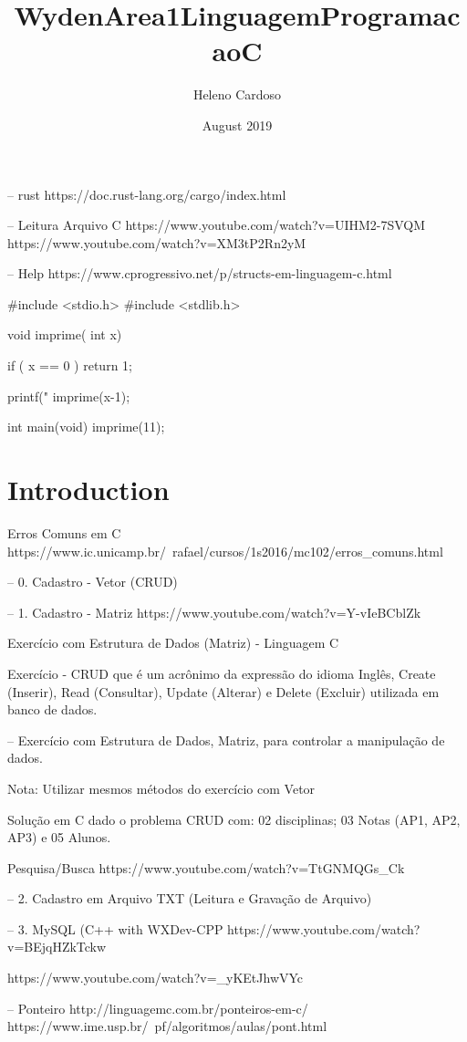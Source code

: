 \documentclass{article}
\title{WydenArea1LinguagemProgramacaoC}
\author{Heleno Cardoso}
\date{August 2019}
\begin{document}
-- rust
https://doc.rust-lang.org/cargo/index.html

\maketitle

-- Leitura Arquivo C
https://www.youtube.com/watch?v=UIHM2-7SVQM
https://www.youtube.com/watch?v=XM3tP2Rn2yM

-- Help
https://www.cprogressivo.net/p/structs-em-linguagem-c.html

#include <stdio.h>
#include <stdlib.h>

void imprime( int x){
  if ( x == 0 ) return 1;

  printf("%
  imprime(x-1);
}

int main(void){
   imprime(11);
}
  

\section{Introduction}
Erros Comuns em C
https://www.ic.unicamp.br/~rafael/cursos/1s2016/mc102/erros_comuns.html

-- 0. Cadastro - Vetor (CRUD)

-- 1. Cadastro - Matriz
https://www.youtube.com/watch?v=Y-vIeBCblZk

Exercício com Estrutura de Dados (Matriz) - Linguagem C

Exercício - CRUD que é um acrônimo da expressão do idioma Inglês, Create (Inserir), Read (Consultar), Update (Alterar) e Delete (Excluir) utilizada em banco de dados.

-- Exercício com Estrutura de Dados, Matriz, para controlar a manipulação de dados.

Nota: Utilizar mesmos métodos do exercício com Vetor

Solução em C dado o problema CRUD com: 02 disciplinas; 03 Notas (AP1, AP2, AP3) e 05 Alunos.

Pesquisa/Busca
https://www.youtube.com/watch?v=TtGNMQGs_Ck

-- 2. Cadastro em Arquivo TXT (Leitura e Gravação de Arquivo)

-- 3. MySQL (C++ with WXDev-CPP
https://www.youtube.com/watch?v=BEjqHZkTckw

https://www.youtube.com/watch?v=_yKEtJhwVYc

-- Ponteiro
http://linguagemc.com.br/ponteiros-em-c/
https://www.ime.usp.br/~pf/algoritmos/aulas/pont.html
\end{document}
